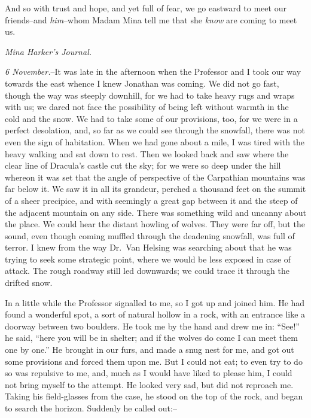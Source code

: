 \documentclass[12pt,openright]{book}
\begin{document}
And so with trust and hope, and yet full of fear, we go eastward to meet our friends–and \textit{him}–whom Madam Mina tell me that she \textit{know} are coming to meet us.

\textit{Mina Harker’s Journal.}

\textit{6 November.}–It was late in the afternoon when the Professor and I took our way towards the east whence I knew Jonathan was coming. We did not go fast, though the way was steeply downhill, for we had to take heavy rugs and wraps with us; we dared not face the possibility of being left without warmth in the cold and the snow. We had to take some of our provisions, too, for we were in a perfect desolation, and, so far as we could see through the snowfall, there was not even the sign of habitation. When we had gone about a mile, I was tired with the heavy walking and sat down to rest. Then we looked back and saw where the clear line of Dracula’s castle cut the sky; for we were so deep under the hill whereon it was set that the angle of perspective of the Carpathian mountains was far below it. We saw it in all its grandeur, perched a thousand feet on the summit of a sheer precipice, and with seemingly a great gap between it and the steep of the adjacent mountain on any side. There was something wild and uncanny about the place. We could hear the distant howling of wolves. They were far off, but the sound, even though coming muffled through the deadening snowfall, was full of terror. I knew from the way Dr. Van Helsing was searching about that he was trying to seek some strategic point, where we would be less exposed in case of attack. The rough roadway still led downwards; we could trace it through the drifted snow.

In a little while the Professor signalled to me, so I got up and joined him. He had found a wonderful spot, a sort of natural hollow in a rock, with an entrance like a doorway between two boulders. He took me by the hand and drew me in: “See!” he said, “here you will be in shelter; and if the wolves do come I can meet them one by one.” He brought in our furs, and made a snug nest for me, and got out some provisions and forced them upon me. But I could not eat; to even try to do so was repulsive to me, and, much as I would have liked to please him, I could not bring myself to the attempt. He looked very sad, but did not reproach me. Taking his field-glasses from the case, he stood on the top of the rock, and began to search the horizon. Suddenly he called out:–
\end{document}
